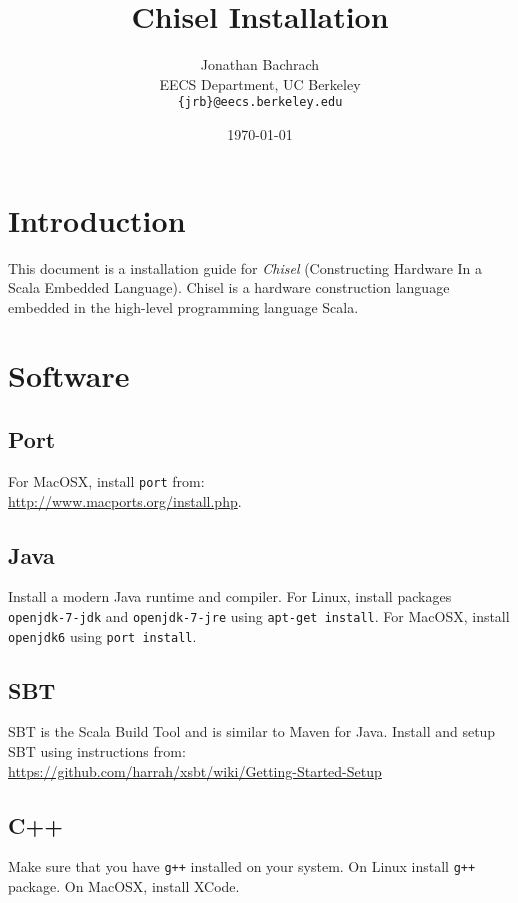 \documentclass[10pt]{article}
\title{Chisel Installation}
\author{Jonathan Bachrach \\
EECS Department, UC Berkeley\\
{\tt  \{jrb\}@eecs.berkeley.edu}
}
\date{\today}
\begin{document}
\maketitle{}

\section{Introduction}

This document is a installation guide for {\em Chisel} (Constructing
Hardware In a Scala Embedded Language).  Chisel is a hardware
construction language embedded in the high-level programming language
Scala.  

\section{Software}

\subsection{Port}

For MacOSX, install \verb+port+ from:\\

\url{http://www.macports.org/install.php}.

\subsection{Java}

Install a modern Java runtime and compiler.
For Linux, install packages \verb+openjdk-7-jdk+ and
\verb+openjdk-7-jre+ using \verb+apt-get install+.
For MacOSX, install \verb+openjdk6+ using \verb+port install+.

\subsection{SBT}

SBT is the Scala Build Tool and is similar to Maven for Java.  Install
and setup SBT using instructions from: \\

\url{https://github.com/harrah/xsbt/wiki/Getting-Started-Setup}

\subsection{C++}

Make sure that you have \verb|g++| installed on your system.  On Linux
install \verb|g++| package.  On MacOSX, install XCode.
\end{document}
